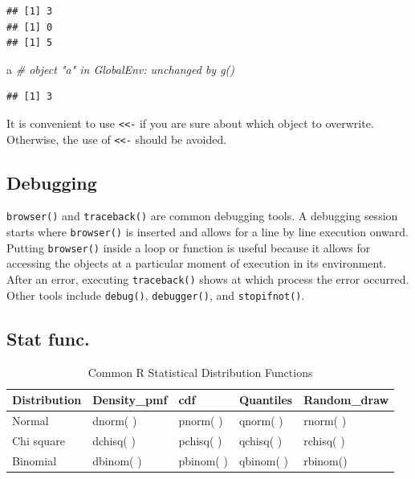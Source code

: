 \documentclass[]{book}
\newenvironment{Shaded}{\begin{snugshade}}{\end{snugshade}}
\newcommand{\CommentTok}[1]{\textcolor[rgb]{0.56,0.35,0.01}{\textit{{#1}}}}
\newcommand{\NormalTok}[1]{{#1}}
\theoremstyle{definition}
\theoremstyle{definition}
\theoremstyle{remark}
\begin{document}
\begin{verbatim}
## [1] 3
## [1] 0
## [1] 5
\end{verbatim}

\begin{Shaded}
\begin{Highlighting}[]
\NormalTok{a   }\CommentTok{# object "a" in GlobalEnv: unchanged by g()}
\end{Highlighting}
\end{Shaded}

\begin{verbatim}
## [1] 3
\end{verbatim}

It is convenient to use \texttt{\textless{}\textless{}-} if you are sure
about which object to overwrite. Otherwise, the use of
\texttt{\textless{}\textless{}-} should be avoided.

\subsection{Debugging}\label{debugging}

\texttt{browser()} and \texttt{traceback()} are common debugging tools.
A debugging session starts where \texttt{browser()} is inserted and
allows for a line by line execution onward. Putting \texttt{browser()}
inside a loop or function is useful because it allows for accessing the
objects at a particular moment of execution in its environment. After an
error, executing \texttt{traceback()} shows at which process the error
occurred. Other tools include \texttt{debug()}, \texttt{debugger()}, and
\texttt{stopifnot()}.

\subsection{Stat func.}\label{stat-func.}

\begin{table}

\caption{\label{tab:unnamed-chunk-28}Common R Statistical Distribution Functions}
\centering
\begin{tabular}[t]{l|l|l|l|l}
\hline
Distribution & Density\_pmf & cdf & Quantiles & Random\_draw\\
\hline
Normal & dnorm( ) & pnorm( ) & qnorm( ) & rnorm( )\\
\hline
Chi square & dchisq( ) & pchisq( ) & qchisq( ) & rchisq( )\\
\hline
Binomial & dbinom( ) & pbinom( ) & qbinom( ) & rbinom()\\
\hline
\end{tabular}
\end{table}
\end{document}
